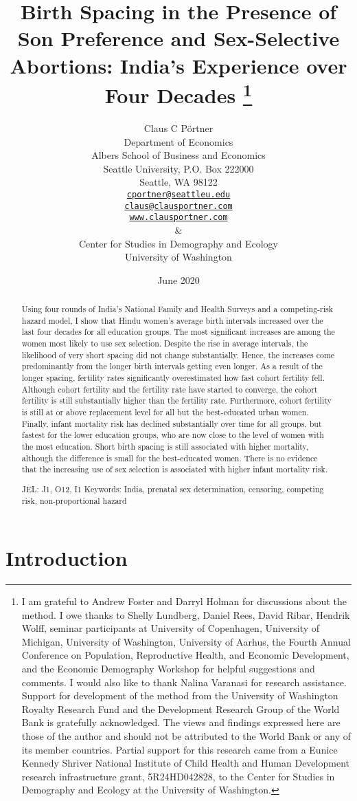 \documentclass[12pt,letterpaper]{article}
\title{Birth Spacing in the Presence of Son Preference and Sex-Selective Abortions:
India's Experience over Four Decades%
\protect\thanks{%
I am grateful to Andrew Foster and Darryl Holman for discussions about the method.
I owe thanks to Shelly Lundberg, Daniel Rees, David Ribar, 
Hendrik Wolff, seminar participants at University of Copenhagen, University of Michigan, 
University of Washington, University of Aarhus, the Fourth 
Annual Conference on Population, Reproductive Health, 
and Economic Development, and the Economic Demography Workshop for helpful 
suggestions and comments.
I would also like to thank Nalina Varanasi for research assistance.
Support for development of the method from the University of Washington Royalty 
Research Fund and the Development Research Group of the World Bank is gratefully 
acknowledged.
The views and findings expressed here are those of the author and
should not be attributed to the World Bank or any of its member countries.
Partial support for this research came from a Eunice Kennedy Shriver National
Institute of Child Health and Human Development research infrastructure grant,
5R24HD042828, to the Center for Studies in Demography and Ecology at the
University of Washington.
}
}
\author{Claus C P\"ortner\\
    Department of Economics\\
    Albers School of Business and Economics\\
    Seattle University, P.O. Box 222000\\
    Seattle, WA 98122\\
    \href{mailto:cportner@seattleu.edu}{\texttt{cportner@seattleu.edu}}\\
    \href{mailto:claus@clausportner.com}{\texttt{claus@clausportner.com}}\\
    \href{http://www.clausportner.com}{\texttt{www.clausportner.com}}\\
    \& \\
    Center for Studies in Demography and Ecology \\
    University of Washington\\ \vspace{2cm}
    }
\date{June 2020}
\begin{document}
\graphicspath{{../figures/}}

\setcounter{page}{-1}
\maketitle
\thispagestyle{empty}



\newpage
\thispagestyle{empty}
\doublespacing

\begin{abstract}

\noindent 
Using four rounds of India's National Family and Health Surveys and a
competing-risk hazard model, I show that Hindu women's average birth intervals
increased over the last four decades for all education groups. The most
significant increases are among the women most likely to use sex
selection. Despite the rise in average intervals, the likelihood of very
short spacing did not change substantially. Hence, the increases come
predominantly from the longer birth intervals getting even longer. As a
result of the longer spacing, fertility rates significantly
overestimated how fast cohort fertility fell. Although cohort fertility
and the fertility rate have started to converge, the cohort fertility is
still substantially higher than the fertility rate. Furthermore, cohort
fertility is still at or above replacement level for all but the
best-educated urban women. Finally, infant mortality risk has declined
substantially over time for all groups, but fastest for the lower
education groups, who are now close to the level of women with the most
education. Short birth spacing is still associated with higher
mortality, although the difference is small for the best-educated women.
There is no evidence that the increasing use of sex selection is
associated with higher infant mortality risk.

\noindent JEL: J1, O12, I1
\noindent Keywords: India, prenatal sex determination, censoring, competing risk, non-proportional hazard
\end{abstract}

\newpage



\section{Introduction\label{sec:intro}}
\end{document}
